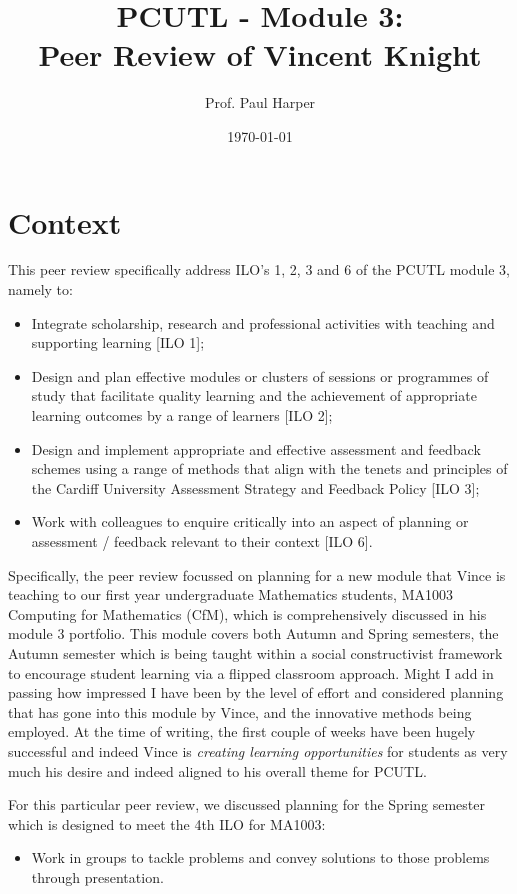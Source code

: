 \documentclass[a4paper,12pt]{article}
\title{PCUTL - Module 3:\\ Peer Review of Vincent Knight}
\author{Prof. Paul Harper}
\date{\today}
\begin{document}
\maketitle

\section{Context}

This peer review specifically address ILO's 1, 2, 3 and 6 of the PCUTL module 3, namely to:
\begin{itemize}
\item Integrate scholarship, research and professional activities with teaching and supporting learning [ILO 1];
\item Design and plan effective modules or clusters of sessions or programmes of study that facilitate quality learning and the achievement of appropriate learning outcomes by a range of learners [ILO 2];
\item Design and implement appropriate and effective assessment and feedback schemes using a range of methods that align with the tenets and principles of the Cardiff University Assessment Strategy and Feedback Policy [ILO 3];
 \item Work with colleagues to enquire critically into an aspect of planning or assessment / feedback relevant to their context [ILO 6].
\end{itemize}

Specifically, the peer review focussed on planning for a new module that Vince is teaching to our first year undergraduate Mathematics students, MA1003 Computing for Mathematics (CfM), which is comprehensively discussed in his module 3 portfolio.  This module covers both Autumn and Spring semesters, the Autumn semester which is being taught within a social constructivist framework to encourage student learning via a flipped classroom approach.  Might I add in passing how impressed I have been by the level of effort and considered planning that has gone into this module by Vince, and the innovative methods being employed.  At the time of writing, the first couple of weeks have been hugely successful and indeed Vince is \emph{creating learning opportunities} for students as very much his desire and indeed aligned to his overall theme for PCUTL.

For this particular peer review, we discussed planning for the Spring semester which is designed to meet the 4th ILO for MA1003:

\begin{itemize}
  \item Work in groups to tackle problems and convey solutions to those problems through presentation.
\end{itemize}
\end{document}
